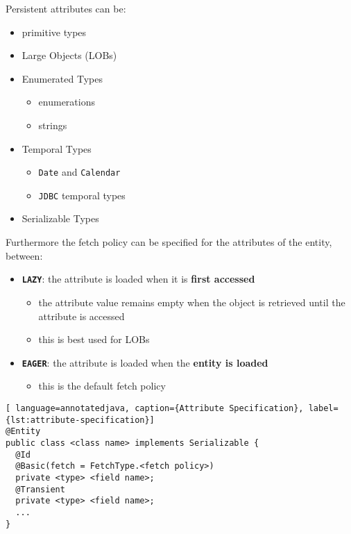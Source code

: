 \documentclass[english]{article}
\begin{document}
Persistent attributes can be:

\begin{itemize}
  \item primitive types
  \item Large Objects (LOBs)
  \item Enumerated Types
        \begin{itemize}
          \item \java enumerations
          \item strings
        \end{itemize}
  \item Temporal Types
        \begin{itemize}
          \item \java \texttt{Date} and \texttt{Calendar}
          \item \texttt{JDBC} temporal types
        \end{itemize}
  \item Serializable Types
\end{itemize}

Furthermore the fetch policy can be specified for the attributes of the entity, between:

\begin{itemize}
  \item \textbf{\texttt{LAZY}}: the attribute is loaded when it is \textbf{first accessed}
        \begin{itemize}
          \item the attribute value remains empty when the object is retrieved until the attribute is accessed
          \item this is best used for LOBs
        \end{itemize}
  \item \textbf{\texttt{EAGER}}: the attribute is loaded when the \textbf{entity is loaded}
        \begin{itemize}
          \item this is the default fetch policy
        \end{itemize}
\end{itemize}

\begin{lstlisting}[ language=annotatedjava, caption={Attribute Specification}, label={lst:attribute-specification}]
@Entity
public class <class name> implements Serializable {
  @Id
  @Basic(fetch = FetchType.<fetch policy>)
  private <type> <field name>;
  @Transient
  private <type> <field name>;
  ...
}
\end{lstlisting}
\end{document}
